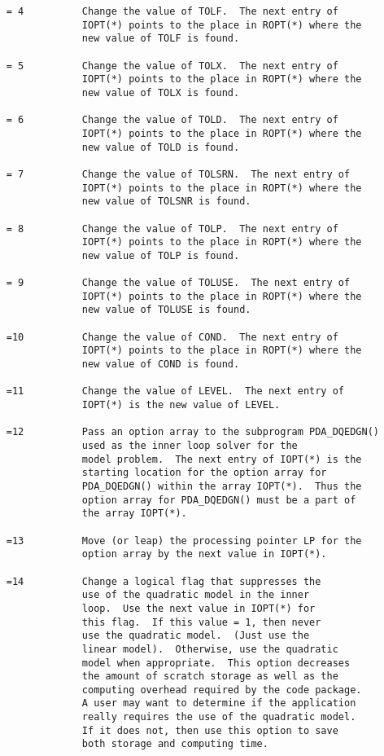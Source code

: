 \begin{verbatim}
     = 4          Change the value of TOLF.  The next entry of
                  IOPT(*) points to the place in ROPT(*) where the
                  new value of TOLF is found.

     = 5          Change the value of TOLX.  The next entry of
                  IOPT(*) points to the place in ROPT(*) where the
                  new value of TOLX is found.

     = 6          Change the value of TOLD.  The next entry of
                  IOPT(*) points to the place in ROPT(*) where the
                  new value of TOLD is found.

     = 7          Change the value of TOLSRN.  The next entry of
                  IOPT(*) points to the place in ROPT(*) where the
                  new value of TOLSNR is found.

     = 8          Change the value of TOLP.  The next entry of
                  IOPT(*) points to the place in ROPT(*) where the
                  new value of TOLP is found.

     = 9          Change the value of TOLUSE.  The next entry of
                  IOPT(*) points to the place in ROPT(*) where the
                  new value of TOLUSE is found.

     =10          Change the value of COND.  The next entry of
                  IOPT(*) points to the place in ROPT(*) where the
                  new value of COND is found.

     =11          Change the value of LEVEL.  The next entry of
                  IOPT(*) is the new value of LEVEL.

     =12          Pass an option array to the subprogram PDA_DQEDGN()
                  used as the inner loop solver for the
                  model problem.  The next entry of IOPT(*) is the
                  starting location for the option array for
                  PDA_DQEDGN() within the array IOPT(*).  Thus the
                  option array for PDA_DQEDGN() must be a part of
                  the array IOPT(*).

     =13          Move (or leap) the processing pointer LP for the
                  option array by the next value in IOPT(*).

     =14          Change a logical flag that suppresses the
                  use of the quadratic model in the inner
                  loop.  Use the next value in IOPT(*) for
                  this flag.  If this value = 1, then never
                  use the quadratic model.  (Just use the
                  linear model).  Otherwise, use the quadratic
                  model when appropriate.  This option decreases
                  the amount of scratch storage as well as the
                  computing overhead required by the code package.
                  A user may want to determine if the application
                  really requires the use of the quadratic model.
                  If it does not, then use this option to save
                  both storage and computing time.


\end{verbatim}

